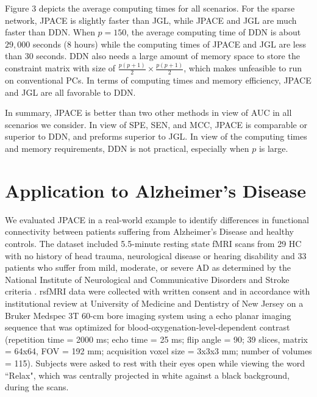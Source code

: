 \documentclass[useAMS,usenatbib,referee]{bio}
\begin{document}
{Figure 3 depicts the average computing times for all scenarios.
For the sparse network, JPACE is slightly faster than JGL, while JPACE and JGL are much faster than DDN.
When $p=150$, the average computing time of DDN is about $29,000$ seconds (8 hours) while the computing times of JPACE and JGL are less than $30$ seconds.
DDN also needs a large amount of memory space to store the constraint matrix with size of $\frac{p(p+1)}{2} \times \frac{p(p+1)}{2}$, which makes unfeasible to run on conventional PCs. In terms of computing times and memory efficiency, JPACE and JGL are all favorable to DDN.

In summary, JPACE is better than two other methods in view of AUC in all scenarios we consider. 
In view of SPE, SEN, and MCC, JPACE is comparable or superior to DDN, and preforms superior to JGL. In view of the computing times and memory requirements, DDN is not practical, especially when $p$ is large.


\section{Application to Alzheimer's Disease}

We evaluated JPACE in a real-world example to identify differences in functional connectivity between patients suffering from Alzheimer's Disease and healthy controls. The dataset included 5.5-minute resting state fMRI scans from 29 HC with no history of head trauma, neurological disease or hearing disability and 33 patients who suffer from mild, moderate, or severe AD as determined by the National Institute of Neurological and Communicative Disorders and Stroke criteria \citep{McKhann}. rsfMRI data were collected with written consent and in accordance with institutional review at University of Medicine and Dentistry of New Jersey on a Bruker Medspec 3T 60-cm bore imaging system using a echo planar imaging sequence that was optimized for blood-oxygenation-level-dependent contrast (repetition time = 2000 ms; echo time = 25 ms; flip angle = 90; 39 slices, matrix = 64x64, FOV = 192 mm; acquisition voxel size = 3x3x3 mm; number of volumes = 115).  Subjects were asked to rest with their eyes open while viewing the word ``Relax", which was centrally projected in white against a black background, during the scans.

}
\end{document}
